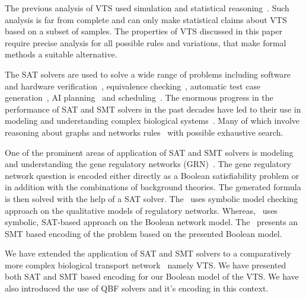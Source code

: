 \noindent The previous analysis of VTS used simulation and statistical reasoning~\cite{mani2016stacking}. 
%
Such analysis is far from complete and can only make statistical claims about VTS based on a subset of samples. 
%
The properties of VTS discussed in this paper require precise analysis for all possible rules and variations, that make formal methods a suitable alternative.

The SAT solvers are used to solve a wide range of problems including
%
software and hardware verification~\cite{biere1999symbolic1, biere1999symbolic2, bjesse2001finding, velev2003effective}, equivalence checking~\cite{goldberg2001using}, automatic test case generation~\cite{stephan1996combinational},
AI planning~\cite{kautz1996pushing} and scheduling~\cite{gomes1998randomization}. 
%
The enormous progress in the performance of SAT and SMT solvers
in the past decades have led to their use in modeling and understanding complex biological systems~\cite{heule2010exact,yordanov2013smt,mangla2010timing}. 
%
Many of which involve reasoning about graphs and networks rules~\cite{guerra2012reasoning,chin2008biographe} with possible exhaustive search.
%

One of the prominent areas of application of SAT and SMT solvers is modeling and understanding the gene regulatory networks (GRN)~\cite{giacobbe2015model,rosenblueth2014inference, yordanov2016method, dunn2014defining, paoletti2014analyzing, koksal2013synthesis}.
%
The gene regulatory network question is encoded either directly as a Boolean satisfiability problem or in addition with the combinations of background theories.
%
The generated formula is then solved with the help of a SAT solver. 
%
The~\cite{rosenblueth2014inference} uses symbolic model checking approach on the qualitative
models of regulatory networks.
%
Whereas,~\cite{dunn2014defining}  uses symbolic, SAT-based approach on the Boolean network model. 
%
The~\cite{giacobbe2015model, yordanov2016method} presents an SMT based encoding of the problem based on the presented Boolean model.
%

We have extended the application of SAT and SMT solvers to a comparatively more complex biological transport network~\cite{mani2016stacking} namely VTS. 
%
We have presented both SAT and SMT based encoding for our Boolean model of the VTS.
%
We have also introduced the use of QBF solvers and it's encoding in this context.
% 

